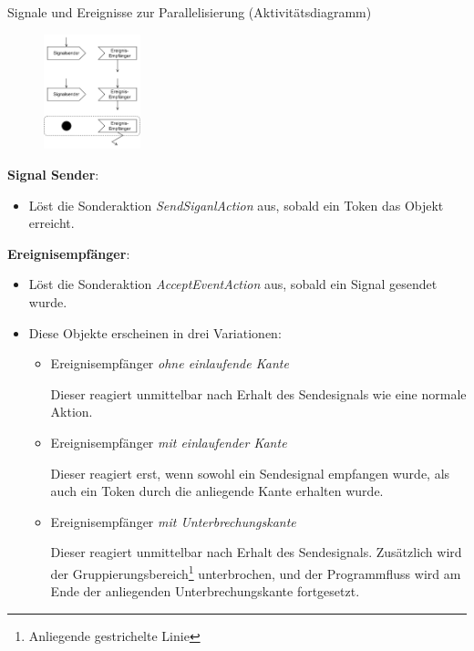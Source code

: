 \begin{diag}{Signale und Ereignisse zur Parallelisierung (Aktivitätsdiagramm)}
    \begin{figure}
        \centering
        \includegraphics[width=0.25\textwidth]{includes/figures/defi_diagrams_activity_signal.pdf}
    \end{figure}
    \textbf{Signal Sender}:
    \begin{itemize}
        \item Löst die Sonderaktion \emph{SendSiganlAction} aus, sobald ein Token das Objekt erreicht.
    \end{itemize}

    \textbf{Ereignisempfänger}:
    \begin{itemize}
        \item Löst die Sonderaktion \emph{AcceptEventAction} aus, sobald ein Signal gesendet wurde.
        \item Diese Objekte erscheinen in drei Variationen:
              \begin{itemize}
                  \item Ereignisempfänger \emph{ohne einlaufende Kante}

                        Dieser reagiert unmittelbar nach Erhalt des Sendesignals wie eine normale Aktion.
                  \item Ereignisempfänger \emph{mit einlaufender Kante}

                        Dieser reagiert erst, wenn sowohl ein Sendesignal empfangen wurde, als auch ein Token durch die anliegende Kante erhalten wurde.
                  \item Ereignisempfänger \emph{mit Unterbrechungskante}

                        Dieser reagiert unmittelbar nach Erhalt des Sendesignals.
                        Zusätzlich wird der Gruppierungsbereich\footnote{Anliegende gestrichelte Linie} unterbrochen, und der Programmfluss wird am Ende der anliegenden Unterbrechungskante fortgesetzt.
              \end{itemize}
    \end{itemize}
\end{diag}

